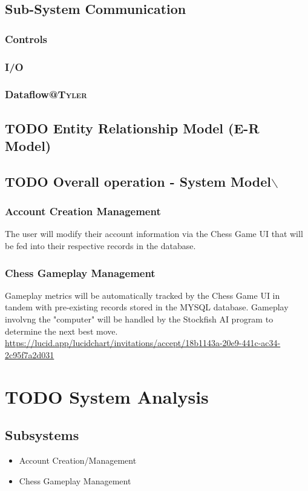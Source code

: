 \documentclass[11pt]{article}
\begin{document}
\subsection{Sub-System Communication}
\label{sec:orgc6f8e78}
\subsubsection{Controls}
\label{sec:org900cd93}
\subsubsection{I/O}
\label{sec:orgf1e2d56}
\subsubsection{Dataflow\hfill{}\textsc{@Tyler}}
\label{sec:org603ce61}
\subsection{{\bfseries\sffamily TODO} Entity Relationship Model (E-R Model)}
\label{sec:org316e622}
\subsection{{\bfseries\sffamily TODO} Overall operation - System Model$\backslash$}
\label{sec:org261b3fe}
\subsubsection{Account Creation Management}
\label{sec:orgac5f684}
The user will modify their account information via the Chess Game
UI that will be fed into their respective records in the database.
\subsubsection{Chess Gameplay Management}
\label{sec:org4ae3dd4}
Gameplay metrics will be automatically tracked by the Chess Game
UI in tandem with pre-existing records stored in the MYSQL
database.
Gameplay involvng the "computer" will be handled by the Stockfish
AI program to determine the next best move.
\url{https://lucid.app/lucidchart/invitations/accept/18b1143a-20e9-441c-ac34-2c95f7a2d031}
\section{{\bfseries\sffamily TODO} System Analysis}
\label{sec:org1dcb15f}
\subsection{Subsystems}
\label{sec:org6eb6d65}
\begin{itemize}
\item Account Creation/Management
\item Chess Gameplay Management
\end{itemize}
\end{document}
